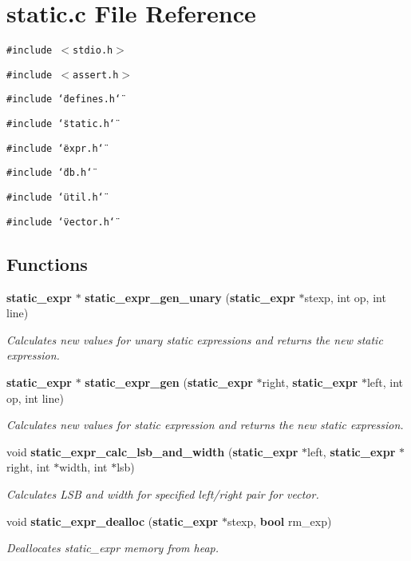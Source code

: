 \section{static.c File Reference}
\label{static_8c}
{\tt \#include $<$stdio.h$>$}\par
{\tt \#include $<$assert.h$>$}\par
{\tt \#include \char`\"{}defines.h\char`\"{}}\par
{\tt \#include \char`\"{}static.h\char`\"{}}\par
{\tt \#include \char`\"{}expr.h\char`\"{}}\par
{\tt \#include \char`\"{}db.h\char`\"{}}\par
{\tt \#include \char`\"{}util.h\char`\"{}}\par
{\tt \#include \char`\"{}vector.h\char`\"{}}\par
\subsection*{Functions}
\begin{CompactItemize}
\item 
{\bf static\_\-expr} $\ast$ {\bf static\_\-expr\_\-gen\_\-unary} ({\bf static\_\-expr} $\ast$stexp, int op, int line)
\begin{CompactList}\small\item\em Calculates new values for unary static expressions and returns the new static expression.\item\end{CompactList}\item 
{\bf static\_\-expr} $\ast$ {\bf static\_\-expr\_\-gen} ({\bf static\_\-expr} $\ast$right, {\bf static\_\-expr} $\ast$left, int op, int line)
\begin{CompactList}\small\item\em Calculates new values for static expression and returns the new static expression.\item\end{CompactList}\item 
void {\bf static\_\-expr\_\-calc\_\-lsb\_\-and\_\-width} ({\bf static\_\-expr} $\ast$left, {\bf static\_\-expr} $\ast$right, int $\ast$width, int $\ast$lsb)
\begin{CompactList}\small\item\em Calculates LSB and width for specified left/right pair for vector.\item\end{CompactList}\item 
void {\bf static\_\-expr\_\-dealloc} ({\bf static\_\-expr} $\ast$stexp, {\bf bool} rm\_\-exp)
\begin{CompactList}\small\item\em Deallocates static\_\-expr memory from heap.\item\end{CompactList}\end{CompactItemize}



